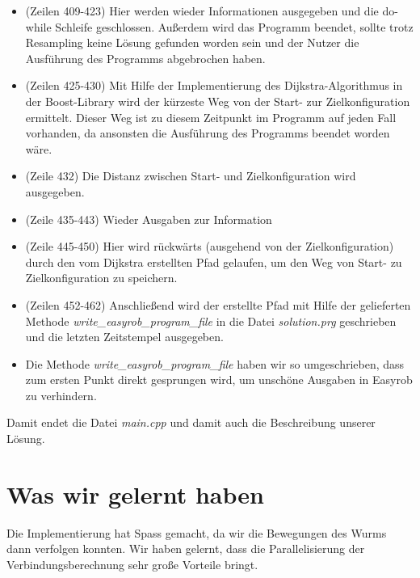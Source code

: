 \documentclass[a4paper]{scrartcl}
\begin{document}
\begin{itemize}
\begin{itemize}
		\item (Zeilen 409-423) Hier werden wieder Informationen ausgegeben und die do-while Schleife geschlossen. Außerdem wird das Programm beendet, sollte trotz Resampling keine Lösung gefunden worden sein und der Nutzer die Ausführung des Programms abgebrochen haben.
		\item (Zeilen 425-430) Mit Hilfe der Implementierung des Dijkstra-Algorithmus in der Boost-Library wird der kürzeste Weg von der Start- zur Zielkonfiguration ermittelt. Dieser Weg ist zu diesem Zeitpunkt im Programm auf jeden Fall vorhanden, da ansonsten die Ausführung des Programms beendet worden wäre.
		\item (Zeile 432) Die Distanz zwischen Start- und Zielkonfiguration wird ausgegeben.
		\item (Zeile 435-443) Wieder Ausgaben zur Information
		\item (Zeile 445-450) Hier wird rückwärts (ausgehend von der Zielkonfiguration) durch den vom Dijkstra erstellten Pfad gelaufen, um den Weg von Start- zu Zielkonfiguration zu speichern.
		\item (Zeilen 452-462) Anschließend wird der erstellte Pfad mit Hilfe der gelieferten Methode \textit{write\_easyrob\_program\_file} in die Datei \textit{solution.prg} geschrieben und die letzten Zeitstempel ausgegeben.
		\item Die Methode \textit{write\_easyrob\_program\_file} haben wir so umgeschrieben, dass zum ersten Punkt direkt gesprungen wird, um unschöne Ausgaben in Easyrob zu verhindern.
	\end{itemize} 
\end{itemize}
	Damit endet die Datei \textit{main.cpp} und damit auch die Beschreibung unserer Lösung.
	
\section*{Was wir gelernt haben}

Die Implementierung hat Spass gemacht, da wir die Bewegungen des Wurms dann verfolgen konnten. Wir haben gelernt, dass die Parallelisierung der Verbindungsberechnung sehr große Vorteile bringt.
\end{document}
